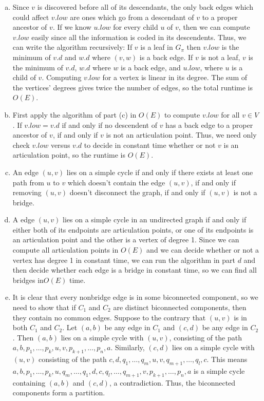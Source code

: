 \documentclass{article}
\begin{document}
\begin{enumerate}[a.]
\item Since $v$ is discovered before all of its descendants, the only back edges which could affect $v.low$ are ones which go from a descendant of $v$ to a proper ancestor of $v$. If we know $u.low$ for every child $u$ of $v$, then we can compute $v.low$ easily since all the information is coded in its descendents.  Thus, we can write the algorithm recursively:  If $v$ is a leaf in $G_\pi$ then $v.low$ is the minimum of $v.d$ and $w.d$ where $(v,w)$ is a back edge.  If $v$ is not a leaf, $v$ is the minimum of $v.d$, $w.d$ where $w$ is a back edge, and $u.low$, where $u$ is a child of $v$.  Computing $v.low$ for a vertex is linear in its degree.  The sum of the vertices' degrees gives twice the number of edges, so the total runtime is $O(E)$.\\

\item First apply the algorithm of part (c) in $O(E)$ to compute $v.low$ for all $v \in V$.  If $v.low = v.d$ if and only if no descendent of $v$ has a back edge to a proper ancestor of $v$, if and only if $v$ is not an articulation point.  Thus, we need only check $v.low$ versus $v.d$ to decide in constant time whether or not $v$ is an articulation point, so the runtime is $O(E)$.\\

\item An edge $(u,v)$ lies on a simple cycle if and only if there exists at least one path from $u$ to $v$ which doesn't contain the edge $(u,v)$, if and only if removing $(u,v)$ doesn't disconnect the graph, if and only if $(u,v)$ is not a bridge. \\

\item A edge $(u,v)$ lies on a simple cycle in an undirected graph if and only if either both of its endpoints are articulation points, or one of its endpoints is an articulation point and the other is a vertex of degree 1.  Since we can compute all articulation points in $O(E)$ and we can decide whether or not a vertex has degree 1 in constant time, we can run the algorithm in part $d$ and then decide whether each edge is a bridge in constant time, so we can find all bridges in$O(E)$ time. \\

\item It is clear that every nonbridge edge is in some biconnected component, so we need to show that if $C_1$ and $C_2$ are distinct biconnected components, then they contain no common edges.  Suppose to the contrary that $(u,v)$ is in both $C_1$ and $C_2$.  Let $(a,b)$ be any edge in $C_1$ and $(c,d)$ be any edge in $C_2$.  Then $(a,b)$ lies on a simple cycle with $(u,v)$, consisting of the path $a, b, p_1, \ldots, p_k, u, v, p_{k+1}, \ldots, p_n, a$.  Similarly, $(c,d)$ lies on a simple cycle with $(u,v)$ consisting of the path $c,d,q_1, \ldots, q_m, u,v, q_{m+1}, \ldots, q_l, c$.  This means $a,b,p_1, \ldots, p_k, u, q_m, \ldots, q_1, d, c, q_l, \ldots, q_{m+1}, v, p_{k+1}, \ldots, p_n, a$ is a simple cycle containing $(a,b)$ and $(c,d)$, a contradiction.  Thus, the biconnected components form a partition. \\


\end{enumerate}
\end{document}
